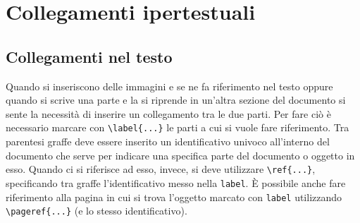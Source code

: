 \section{Collegamenti ipertestuali}
\label{sec:hyper}

\subsection{Collegamenti nel testo}
Quando si inseriscono delle immagini e se ne fa riferimento nel testo oppure 
quando si scrive una parte e la si riprende in un'altra sezione del documento 
si sente la necessità di inserire un collegamento tra le due parti. Per fare 
ciò è necessario marcare con \verb!\label{...}! le parti a cui si vuole fare 
riferimento. Tra parentesi graffe deve essere inserito un identificativo 
univoco all'interno del documento che serve per indicare una specifica parte 
del documento o oggetto in esso. Quando ci si riferisce ad esso, invece, si 
deve utilizzare \verb!\ref{...}!, specificando tra graffe l'identificativo 
messo nella \verb!label!. È possibile anche fare riferimento alla pagina in 
cui si trova l'oggetto marcato con \verb!label! utilizzando 
\verb!\pageref{...}! (e lo stesso identificativo).

